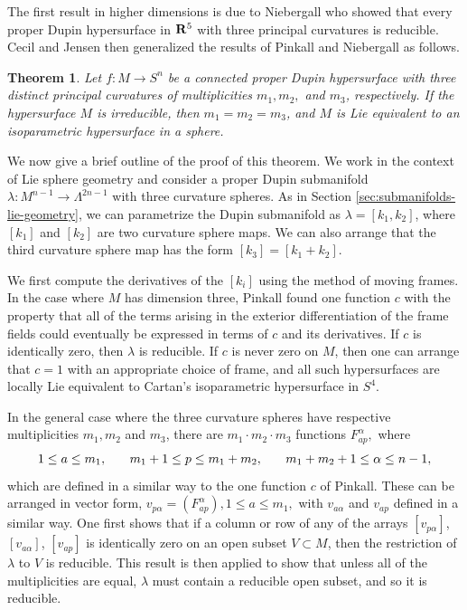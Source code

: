 \documentclass[12pt]{article}
\newtheorem{theorem}{Theorem}[section]
\begin{document}
{The first result in higher dimensions is due to Niebergall
\cite{N1} who showed that every proper Dupin hypersurface
in ${\bf R}^5$ with three principal curvatures is reducible.
Cecil and Jensen \cite{CJ2} then generalized the
results of Pinkall and Niebergall as follows. 
\begin{theorem}
\label{thm:CJ-3-p-c}
Let $f:M \rightarrow S^n$ be a connected proper Dupin hypersurface with
three distinct principal curvatures of multiplicities
$m_1, m_2,$ and $m_3$, respectively.  If the hypersurface $M$ is
irreducible, then $m_1 = m_2 = m_3$, and $M$ is Lie 
equivalent to an isoparametric hypersurface in a sphere.
\end{theorem}

We now give a brief outline of the proof of this theorem.
We work in the context of Lie sphere geometry and consider
a proper Dupin submanifold $\lambda :M^{n-1} \rightarrow \Lambda ^{2n-1}$
with three curvature spheres.  As in Section \ref{sec:submanifolds-lie-geometry}, we can parametrize
the Dupin submanifold as
$\lambda = [k_1 , k_2 ]$, where $[k_1]$ and $[k_2]$ are two
curvature sphere maps.  We can also arrange that the third
curvature sphere map has the form $[k_3] = [k_1 + k_2]$.  

We first compute the derivatives of the $[k_i]$ using the method
of moving frames.  In the case where $M$ has dimension three, Pinkall \cite{P3}
found one function $c$ with the property that all of the terms
arising in the exterior differentiation 
of the frame fields could eventually be expressed
in terms of $c$ and its derivatives.  If $c$ is identically zero,
then $\lambda$ is reducible.  If $c$ is never zero on $M$, then
one can arrange that $c=1$ with an appropriate choice of frame,
and all such hypersurfaces are locally Lie equivalent to Cartan's
isoparametric hypersurface in $S^4$.

In the general case where the three curvature spheres have respective
multiplicities $m_1, m_2$ and $m_3$, there are
$m_1 \cdot m_2 \cdot m_3$ functions 
$F^{\alpha}_{ap},$ where
\[1\leq a \leq m_1, \hspace{.25in} m_1 + 1 \leq p \leq m_1 + m_2,
\hspace{.25in} m_1 + m_2 + 1 \leq \alpha \leq n-1,\]
which are defined in a similar
way to the one function $c$ of Pinkall. These can be arranged
in vector form, 
$v_{p\alpha} = (F^{\alpha}_{ap}),  1 \leq a \leq m_1,$ with
$v_{a\alpha}$ and  $v_{ap}$ defined in a similar way.  One first
shows that if a column or row of any of the arrays 
$[v_{p\alpha}]$, $[v_{a\alpha}]$, $[v_{ap}]$ is identically
zero on an open subset $V \subset M$, then the restriction of
$\lambda$ to $V$ is reducible.
This result is then applied to show
that unless all of the multiplicities are equal, 
$\lambda$ must contain a reducible open subset,  and so it is reducible.

}
\end{document}
